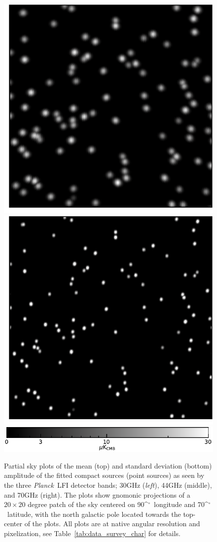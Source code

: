 \documentclass{aa}
\def\Planck{\textit{Planck}}
\def\,{\thinspace}
\def\deg{\ifmmode^\circ\else$^\circ$\fi}
\begin{document}
\begin{figure}
  \includegraphics[width=0.32\linewidth]{figs/radio_044_stddev_gnomonic_90lon70lat_20x20deg_cmap-neutral_nobar_logscale.pdf}
  \includegraphics[width=0.32\linewidth]{figs/radio_070_stddev_gnomonic_90lon70lat_20x20deg_cmap-neutral_nobar_logscale.pdf}\\
  \includegraphics[width=0.7\linewidth]{figs/colorbar_0_to_30_log_w18_uKcmb_c-neutral.pdf}

  \caption{Partial sky plots of the mean (top) and
    standard deviation (bottom) amplitude of the
    fitted compact sources (point sources) as seen by
    the three \Planck\ LFI detector bands; 30\,GHz (\emph{left}),
    44\,GHz (middle), and 70\,GHz (right).
    The plots show gnomonic projections of a $20\times 20$
    degree patch of the sky centered on 90\deg\ longitude and
    70\deg\ latitude, with the north galactic pole located towards
    the top-center of the plots. All plots are at native angular
    resolution and pixelization, see Table~\ref{tab:data_survey_char}
    for details. }
  \label{fig:BP_radio}
\end{figure}
\end{document}
